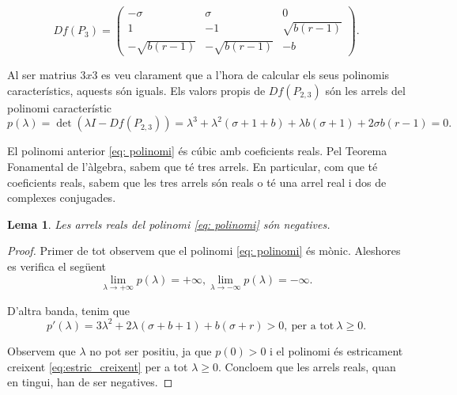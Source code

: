 \documentclass[11pt,a4paper,openright,oneside]{article}
\numberwithin{equation}{section}
\newtheorem{lema}[teo]{Lema}
\theoremstyle{definition}
\begin{document}
\begin{enumerate}
\begin{itemize}
        \begin{equation*}
            Df(P_3)= \begin{pmatrix}
            -\sigma & \sigma & 0\\
            1 & -1 & \sqrt{b(r-1)}\\
            -\sqrt{b(r-1)} & -\sqrt{b(r-1)} & -b
        \end{pmatrix}.\end{equation*}
    
        Al ser matrius $3x3$ es veu clarament que a l'hora de calcular els seus polinomis característics, aquests són iguals. Els valors propis de $Df\left(P_{2,3}\right)$ són les arrels del polinomi característic
        \begin{equation} \label{eq: polinomi}
            p(\lambda)=\det\left(\lambda I - Df\left(P_{2,3}\right)\right)=\lambda^{3}+\lambda^{2}\left(\sigma+1+b\right)+\lambda b\left(\sigma+1\right)+2\sigma b\left(r-1\right)=0.
        \end{equation}
    
        El polinomi anterior \eqref{eq: polinomi} és cúbic amb coeficients reals. Pel Teorema Fonamental de l'àlgebra, sabem que té tres arrels. En particular, com que té coeficients reals, sabem que les tres arrels són reals o té una arrel real i dos de complexes conjugades.
    
        \begin{lema} \label{lema: vaps}
            Les arrels reals del polinomi \eqref{eq: polinomi} són negatives.
        \end{lema}
        
        \begin{proof} 
            Primer de tot observem que el polinomi \eqref{eq: polinomi} és mònic. Aleshores es verifica el següent \begin{equation*}
                \lim_{\lambda \to +\infty}p(\lambda)=+\infty, \lim_{\lambda \to -\infty}p(\lambda)=-\infty.
            \end{equation*}
        
            D'altra banda, tenim que \begin{equation} \label{eq:estric_creixent}
                p'(\lambda)=3\lambda^{2}+2\lambda(\sigma + b +1)+b(\sigma + r)>0, \ \text{per a tot} \ \lambda\geq0.
            \end{equation}
            
            Observem que $\lambda$ no pot ser positiu, ja que $p(0)>0$ i el polinomi és estricament creixent \eqref{eq:estric_creixent} per a tot $\lambda\geq0$. Concloem que les arrels reals, quan en tingui, han de ser negatives.
        \end{proof}


\end{itemize}
\end{enumerate}
\end{document}
